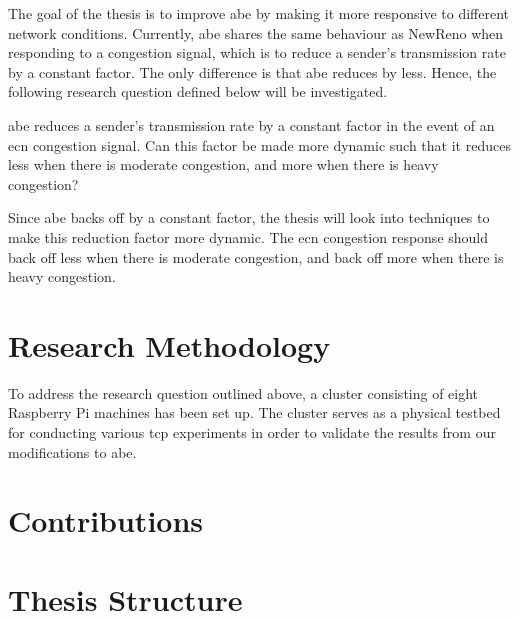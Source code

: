 The goal of the thesis is to improve \gls{abe} by making it more responsive to different network conditions. Currently, \gls{abe} shares the same behaviour as NewReno when responding to a congestion signal, which is to reduce a sender's transmission rate by a constant factor. The only difference is that \gls{abe} reduces by less.  Hence, the following research question defined below will be investigated.

\begin{statement}
    \gls{abe} reduces a sender's transmission rate by a constant factor in the event of an \gls{ecn} congestion signal. Can this factor be made more dynamic such that it reduces less when there is moderate congestion, and more when there is heavy congestion?
\end{statement}

Since \gls{abe} backs off by a constant factor, the thesis will look into techniques to make this reduction factor more dynamic. The \gls{ecn} congestion response should back off less when there is moderate congestion, and back off more when there is heavy congestion. 









\section{Research Methodology}

To address the research question outlined above, a cluster consisting of eight Raspberry Pi machines has been set up. The cluster serves as a physical testbed for conducting various \gls{tcp} experiments in order to validate the results from our modifications to \gls{abe}. 









\section{Contributions}








\section{Thesis Structure}

